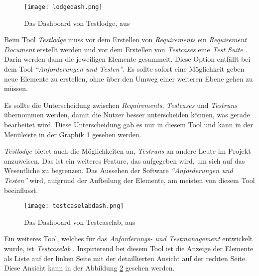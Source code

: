\documentclass[11pt,a4paper]{report}
\begin{document}

\begin{figure}[htpb]
  \centering
  \texttt{[image: lodgedash.png]}
  \caption{Das Dashboard von Testlodge, aus \cite{testlodge}}
  \label{f:lodgedash}
\end{figure}


Beim Tool \textit{Testlodge} muss vor dem Erstellen von \textit{Requirements} ein \textit{Requirement Document} erstellt werden und vor dem Erstellen von \textit{Testcases} eine \textit{Test Suite} \cite{testlodge}. Darin werden dann die jeweiligen Elemente gesammelt. Diese Option entfällt bei dem Tool \textit{"`Anforderungen und Testen"'}. Es sollte sofort eine Möglichkeit geben neue Elemente zu erstellen, ohne über den Umweg einer weiteren Ebene gehen zu müssen.

Es sollte die Unterscheidung zwischen \textit{Requirements}, \textit{Testcases} und \textit{Testruns} übernommen werden, damit die Nutzer besser unterscheiden können, was gerade bearbeitet wird. Diese Unterscheidung gab es nur in diesem Tool und kann in der Menüleiste in der Graphik \ref{f:lodgedash} gesehen werden.

\textit{Testlodge} bietet auch die Möglichkeiten an, \textit{Testruns} an andere Leute im Projekt anzuweisen. Das ist ein weiteres Feature, das aufgegeben wird, um sich auf das Wesentliche zu begrenzen. Das Aussehen der Software \textit{"`Anforderungen und Testen"'} wird, aufgrund der Aufteilung der Elemente, am meisten von diesem Tool beeinflusst.





















\begin{figure}[htpb]
  \centering
  \texttt{[image: testcaselabdash.png]}
  \caption{Das Dashboard von Testcaselab, aus \cite{testcaselab}}
  \label{f:testcaselabdash}
\end{figure}

Ein weiteres Tool, welches für das \textit{Anforderungs- und Testmanagement} entwickelt wurde, ist \textit{Testcaselab} \cite{testcaselab}. Inspirierend bei diesem Tool ist die Anzeige der Elemente als Liste auf der linken Seite mit der detaillierten Ansicht auf der rechten Seite. Diese Ansicht kann in der Abbildung \ref{f:testcaselabdash} gesehen werden. 
\end{document}
